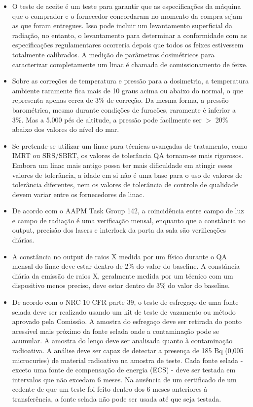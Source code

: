 \documentclass[11pt,a4paper]{article}
\newcounter{exemplo}
\begin{document}
\begin{exemplo}
\begin{itemize}
        \item O teste de aceite é um teste para garantir que as especificações da máquina que o comprador e o fornecedor concordaram no momento da compra sejam as que foram entregues. Isso pode incluir um levantamento superficial da radiação, no entanto, o levantamento para determinar a conformidade com as especificações regulamentares ocorreria depois que todos os feixes estivessem totalmente calibrados. A medição de parâmetros dosimétricos para caracterizar completamente um linac é chamada de comissionamento de feixe.
        
        \item Sobre as correções de temperatura e pressão para a dosimetria, a temperatura ambiente raramente fica mais de 10 graus acima ou abaixo do normal, o que representa apenas cerca de 3\% de correção. Da mesma forma, a pressão barométrica, mesmo durante condições de furacões, raramente é inferior a 3\%. Mas a 5.000 pés de altitude, a pressão pode facilmente ser $>$ 20\% abaixo dos valores do nível do mar.
        
        \item Se pretende-se utilizar um linac para técnicas avançadas de tratamento, como IMRT ou SRS/SBRT, os valores de tolerância QA tornam-se mais rigorosos. Embora um linac mais antigo possa ter mais dificuldade em atingir esses valores de tolerância, a idade em si não é uma base para o uso de valores de tolerância diferentes, nem os valores de tolerância de controle de qualidade devem variar entre os fornecedores de linac.
        
        \item De acordo com o AAPM Task Group 142, a coincidência entre campo de luz e campo de radiação é uma verificação mensal, enquanto que a constância no output, precisão dos lasers e interlock da porta da sala são verificações diárias.
        
        \item A constância no output de raios X medida por um físico durante o QA mensal do linac deve estar dentro de 2\% do valor do baseline. A constância diária da emissão de raios X, geralmente medida por um técnico com um dispositivo menos preciso, deve estar dentro de 3\% do valor do baseline.
        
        \item De acordo com o NRC 10 CFR parte 39, o teste de esfregaço de uma fonte selada deve ser realizado usando um kit de teste de vazamento ou método aprovado pela Comissão. A amostra do esfregaço deve ser retirada do ponto acessível mais próximo da fonte selada onde a contaminação pode se acumular. A amostra do lenço deve ser analisada quanto à contaminação radioativa. A análise deve ser capaz de detectar a presença de 185 Bq (0,005 microcuries) de material radioativo na amostra de teste. Cada fonte selada - exceto uma fonte de compensação de energia (ECS) - deve ser testada em intervalos que não excedam 6 meses. Na ausência de um certificado de um cedente de que um teste foi feito dentro dos 6 meses anteriores à transferência, a fonte selada não pode ser usada até que seja testada.
        

\end{itemize}
\end{exemplo}
\end{document}
